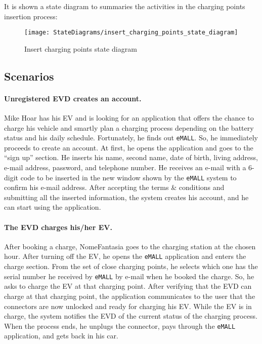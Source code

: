 It is shown a state diagram to summaries the activities in the charging points insertion process:
\begin{figure}[H]
    \begin{center}
        \texttt{[image: StateDiagrams/insert\_charging\_points\_state\_diagram]}
        \caption{Insert charging points state diagram}
        \label{fig:insert_charging_points_sd}
    \end{center}
\end{figure}

\subsection{Scenarios}
\label{subsec:scenarios}%

\paragraph{Unregistered EVD creates an account.}
Mike Hoar has his EV and is looking for an application that offers the chance to charge his vehicle and smartly plan a
charging process depending on the battery status and his daily schedule.
Fortunately, he finds out \verb|eMALL|\@.
So, he immediately proceeds to create an account.
At first, he opens the application and goes to the ``sign up'' section.
He inserts his name, second name, date of birth, living address, e-mail address, password, and telephone number.
He receives an e-mail with a 6-digit code to be inserted in the new window shown by the \verb|eMALL| system to confirm his e-mail address.
After accepting the terms \& conditions and submitting all the inserted information, the system creates his account,
and he can start using the application.

\paragraph{The EVD charges his/her EV.}
After booking a charge, NomeFantasia goes to the charging station at the chosen hour.
After turning off the EV, he opens the \verb|eMALL| application and enters the charge section.
From the set of close charging points, he selects which one has the serial number he received by \verb|eMALL| by e-mail
when he booked the charge.
So, he asks to charge the EV at that charging point.
After verifying that the EVD can charge at that charging point, the application communicates to the user that the
connectors are now unlocked and ready for charging his EV\@.
While the EV is in charge, the system notifies the EVD of the current status of the charging process.
When the process ends, he unplugs the connector, pays through the \verb|eMALL| application, and gets back in his car.


